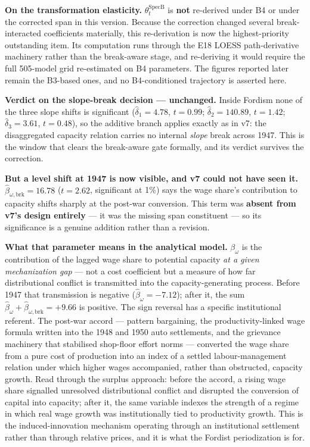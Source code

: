 \documentclass[11pt,a4paper]{article}
\begin{document}
\textbf{On the transformation elasticity.} $\theta_t^{\text{SpecB}}$ is \textbf{not} re-derived under B4 or under the corrected span in this version. Because the correction changed several break-interacted coefficients materially, this re-derivation is now the highest-priority outstanding item. Its computation runs through the E18 LOESS path-derivative machinery rather than the break-aware stage, and re-deriving it would require the full 505-model grid re-estimated on B4 parameters. The figures reported later remain the B3-based ones, and no B4-conditioned trajectory is asserted here.

\FloatBarrier
\textbf{Verdict on the slope-break decision --- unchanged.} Inside Fordism none of the three slope shifts is significant ($\hat{\delta}_1 = 4.78$, $t = 0.99$; $\hat{\delta}_2 = 140.89$, $t = 1.42$; $\hat{\delta}_3 = 3.61$, $t = 0.48$), so the additive branch applies exactly as in v7: the disaggregated capacity relation carries no internal \textit{slope} break across 1947. This is the window that clears the break-aware gate formally, and its verdict survives the correction.

\textbf{But a level shift at 1947 is now visible, and v7 could not have seen it.} $\hat{\beta}_{\omega, \text{brk}} = 16.78$ ($t = 2.62$, significant at 1\%) says the wage share's contribution to capacity shifts sharply at the post-war conversion. This term was \textbf{absent from v7's design entirely} --- it was the missing span constituent --- so its significance is a genuine addition rather than a revision.

\textbf{What that parameter means in the analytical model.} $\beta_{\omega}$ is the contribution of the lagged wage share to potential capacity \textit{at a given mechanization gap} --- not a cost coefficient but a measure of how far distributional conflict is transmitted into the capacity-generating process. Before 1947 that transmission is negative ($\hat{\beta}_{\omega} = -7.12$); after it, the sum $\hat{\beta}_{\omega} + \hat{\beta}_{\omega,\text{brk}} = +9.66$ is positive. The sign reversal has a specific institutional referent. The post-war accord --- pattern bargaining, the productivity-linked wage formula written into the 1948 and 1950 auto settlements, and the grievance machinery that stabilised shop-floor effort norms --- converted the wage share from a pure cost of production into an index of a settled labour-management relation under which higher wages accompanied, rather than obstructed, capacity growth. Read through the surplus approach: before the accord, a rising wage share signalled unresolved distributional conflict and disrupted the conversion of capital into capacity; after it, the same variable indexes the strength of a regime in which real wage growth was institutionally tied to productivity growth. This is the induced-innovation mechanism operating through an institutional settlement rather than through relative prices, and it is what the Fordist periodization is for.
\end{document}

